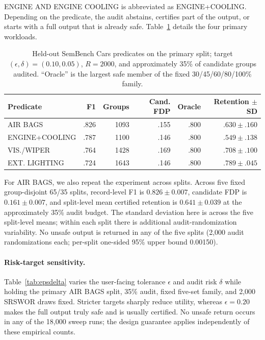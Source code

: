 \documentclass[runningheads]{llncs}
\begin{document}
ENGINE AND ENGINE COOLING is abbreviated as ENGINE+COOLING. Depending on the predicate, the audit abstains, certifies part of the output, or starts with a full output that is already safe. Table~\ref{tab:sembench-real} details the four primary workloads.

\begin{table}[H]
\caption{Held-out SemBench Cars predicates on the primary split; target $(\epsilon,\delta)=(0.10,0.05)$, $R=2000$, and approximately 35\% of candidate groups audited. ``Oracle'' is the largest safe member of the fixed 30/45/60/80/100\% family.}
\label{tab:sembench-real}
\centering
\small
\begin{tabular}{lrrrrr}
\toprule
Predicate & F1 & Groups & Cand. FDP & Oracle & Retention $\pm$ SD \\
\midrule
AIR BAGS & .826 & 1093 & .155 & .800 & $.630\pm.160$\\
ENGINE+COOLING & .787 & 1100 & .146 & .800 & $.549\pm.138$\\
VIS./WIPER & .764 & 1428 & .169 & .800 & $.708\pm.100$\\
EXT. LIGHTING & .724 & 1643 & .146 & .800 & $.789\pm.045$\\
\bottomrule
\end{tabular}
\end{table}

For AIR BAGS, we also repeat the experiment across splits. Across five fixed group-disjoint 65/35 splits, record-level F1 is $0.826\pm0.007$, candidate FDP is $0.161\pm0.007$, and split-level mean certified retention is $0.641\pm0.039$ at the approximately 35\% audit budget. The standard deviation here is across the five split-level means; within each split there is additional audit-randomization variability. No unsafe output is returned in any of the five splits (2,000 audit randomizations each; per-split one-sided 95\% upper bound 0.00150).

\paragraph{Risk-target sensitivity.} Table~\ref{tab:epsdelta} varies the user-facing tolerance $\epsilon$ and audit risk $\delta$ while holding the primary AIR BAGS split, 35\% audit, fixed five-set family, and 2,000 SRSWOR draws fixed. Stricter targets sharply reduce utility, whereas $\epsilon=0.20$ makes the full output truly safe and is usually certified. No unsafe return occurs in any of the 18,000 sweep runs; the design guarantee applies independently of these empirical counts.
\end{document}
